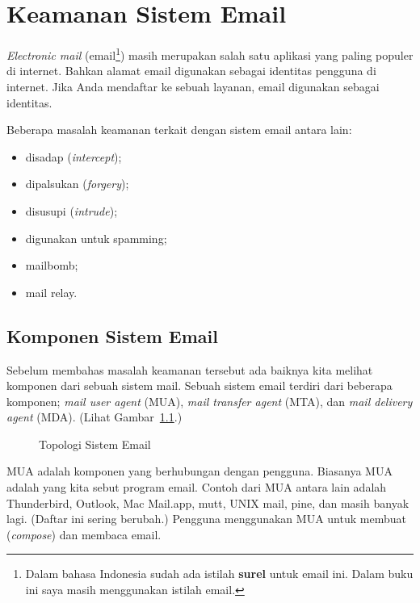 \chapter{Keamanan Sistem Email}

{\em Electronic mail} (email\footnote{Dalam bahasa Indonesia sudah ada istilah
{\bf surel} untuk email ini. Dalam buku ini saya masih menggunakan istilah
email.}) masih merupakan salah satu aplikasi yang paling populer di internet.
Bahkan alamat email digunakan sebagai identitas pengguna di internet. Jika Anda
mendaftar ke sebuah layanan, email digunakan sebagai identitas.

Beberapa masalah keamanan terkait dengan sistem email antara lain:
\begin{itemize}
\item disadap ({\em intercept});
\item dipalsukan ({\em forgery});
\item disusupi ({\em intrude});
\item digunakan untuk spamming;
\item mailbomb;
\item mail relay.
\end{itemize}

\section{Komponen Sistem Email}
Sebelum membahas masalah keamanan tersebut ada baiknya kita melihat komponen
dari sebuah sistem mail.
Sebuah sistem email terdiri dari beberapa komponen;
{\em mail user agent} (MUA),
{\em mail transfer agent} (MTA), dan
{\em mail delivery agent} (MDA).
(Lihat Gambar~\ref{fig:email-topologi}.)

\begin{figure}[ht]
\caption{Topologi Sistem Email}
\label{fig:email-topologi}
\end{figure}

MUA adalah komponen yang berhubungan dengan pengguna. Biasanya MUA adalah yang
kita sebut program email. Contoh dari MUA antara lain adalah Thunderbird,
Outlook, Mac Mail.app, mutt, UNIX mail, pine, dan masih banyak lagi. (Daftar
ini sering berubah.)
Pengguna menggunakan MUA untuk membuat ({\em compose}) dan membaca email.

